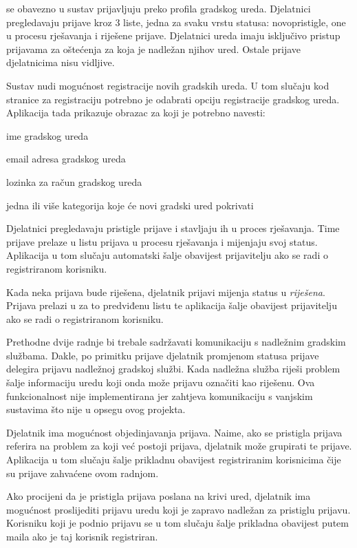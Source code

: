 		 se obavezno u sustav prijavljuju preko profila gradskog ureda. Djelatnici pregledavaju prijave kroz 3 liste, jedna za svaku vrstu statusa: novopristigle, one u procesu rješavanja i riješene prijave. Djelatnici ureda imaju isključivo pristup prijavama za oštećenja za koja je nadležan njihov ured. Ostale prijave djelatnicima nisu vidljive.
		
		Sustav nudi mogućnost registracije novih gradskih ureda. U tom slučaju kod stranice za registraciju potrebno je odabrati opciju registracije gradskog ureda. Aplikacija tada prikazuje obrazac za koji je potrebno navesti:
		\begin{packed_item} 
			\item ime gradskog ureda
			\item email adresa gradskog ureda
			\item lozinka za račun gradskog ureda
			\item jedna ili više kategorija koje će novi gradski ured pokrivati
		\end{packed_item}
		
		Djelatnici pregledavaju pristigle prijave i stavljaju ih u proces rješavanja. Time prijave prelaze u listu prijava u procesu rješavanja i mijenjaju svoj status. Aplikacija u tom slučaju automatski šalje obavijest prijavitelju ako se radi o registriranom korisniku.
		
		Kada neka prijava bude riješena, djelatnik prijavi mijenja status u \textit{riješena}. Prijava prelazi u za to predviđenu listu te aplikacija šalje obavijest prijavitelju ako se radi o registriranom korisniku.
		
		Prethodne dvije radnje bi trebale sadržavati komunikaciju s nadležnim gradskim službama. Dakle, po primitku prijave djelatnik promjenom statusa prijave delegira prijavu nadležnoj gradskoj službi. Kada nadležna služba riješi problem šalje informaciju uredu koji onda može prijavu označiti kao riješenu. Ova funkcionalnost nije implementirana jer zahtjeva komunikaciju s vanjskim sustavima što nije u opsegu ovog projekta.
		
		Djelatnik ima mogućnost objedinjavanja prijava. Naime, ako se pristigla prijava referira na problem za koji već postoji prijava, djelatnik može grupirati te prijave. Aplikacija u tom slučaju šalje prikladnu obavijest registriranim korisnicima čije su prijave zahvaćene ovom radnjom.
		
		Ako procijeni da je pristigla prijava poslana na krivi ured, djelatnik ima mogućnost proslijediti prijavu uredu koji je zapravo nadležan za pristiglu prijavu. Korisniku koji je podnio prijavu se u tom slučaju šalje prikladna obavijest putem maila ako je taj korisnik registriran.
		
